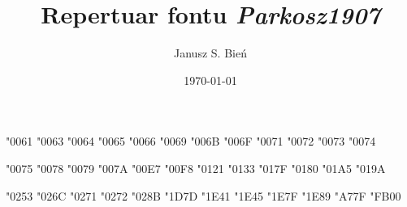 \documentclass{article}
\author{Janusz S. Bień}
\title{Repertuar fontu \textit{Parkosz1907}}
\date{\today}
\begin{document}
\maketitle
\thispagestyle{empty}


\enspace\char"0061
\enspace\char"0063
\enspace\char"0064
\enspace\char"0065
\enspace\char"0066
\enspace\char"0069
%
\enspace\char"006B
\enspace\char"006F
\enspace\char"0071
\enspace\char"0072
\enspace\char"0073
\enspace\char"0074

\enspace\char"0075
\enspace\char"0078
\enspace\char"0079
\enspace\char"007A
\enspace\char"00E7
\enspace\char"00F8
%
\enspace\char"0121
\enspace\char"0133
\enspace\char"017F
\enspace\char"0180
\enspace\char"01A5
\enspace\char"019A

\enspace\char"0253
\enspace\char"026C
\enspace\char"0271
\enspace\char"0272
\enspace\char"028B
\enspace\char"1D7D
%
\enspace\char"1E41
\enspace\char"1E45
\enspace\char"1E7F
\enspace\char"1E89
\enspace\char"A77F
\enspace\char"FB00
\end{document}
